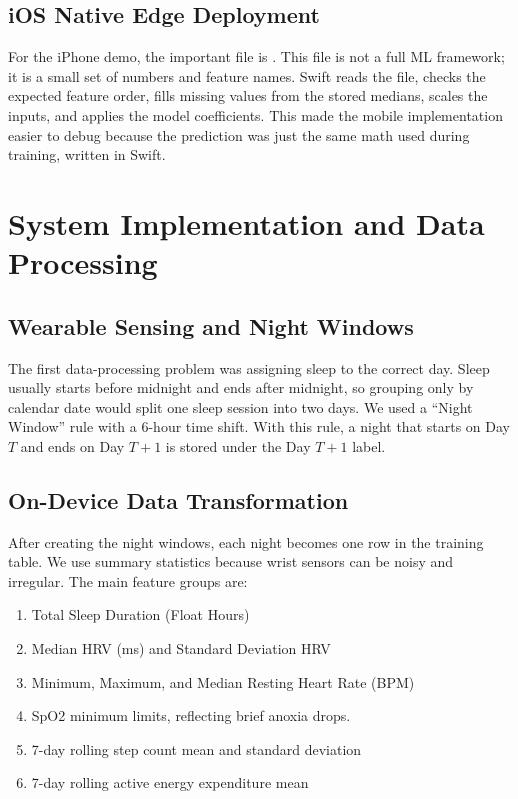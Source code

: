 \documentclass[sigconf,10pt]{acmart}
\begin{document}
\subsection{iOS Native Edge Deployment}
For the iPhone demo, the important file is . This file is not a full ML framework; it is a small set of numbers and feature names. Swift reads the file, checks the expected feature order, fills missing values from the stored medians, scales the inputs, and applies the model coefficients. This made the mobile implementation easier to debug because the prediction was just the same math used during training, written in Swift.

\section{System Implementation and Data Processing}

\subsection{Wearable Sensing and Night Windows}
The first data-processing problem was assigning sleep to the correct day. Sleep usually starts before midnight and ends after midnight, so grouping only by calendar date would split one sleep session into two days. We used a ``Night Window'' rule with a 6-hour time shift. With this rule, a night that starts on Day $T$ and ends on Day $T+1$ is stored under the Day $T+1$ label.

\subsection{On-Device Data Transformation}
After creating the night windows, each night becomes one row in the training table. We use summary statistics because wrist sensors can be noisy and irregular. The main feature groups are:
\begin{enumerate}
    \item Total Sleep Duration (Float Hours)
    \item Median HRV (ms) and Standard Deviation HRV
    \item Minimum, Maximum, and Median Resting Heart Rate (BPM)
    \item SpO2 minimum limits, reflecting brief anoxia drops.
    \item 7-day rolling step count mean and standard deviation
    \item 7-day rolling active energy expenditure mean
\end{enumerate}
\end{document}
